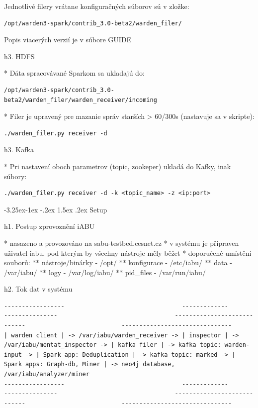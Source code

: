 \documentclass[a4paper]{article} %
\makeatletter
\renewcommand\subsection{\@startsection{subsection}{2}{\z@}%
                   {-3.25ex\@plus -1ex \@minus -.2ex}%
                   {1.5ex \@plus .2ex}%
                   {\normalfont\sffamily\large\bfseries\color{projectcolor}}}
\makeatother
\begin{document}
Jednotlivé filery vrátane konfiguračných súborov sú v zložke:
\begin{lstlisting}[]/opt/warden3-spark/contrib_3.0-beta2/warden_filer/\end{lstlisting}

Popis viacerých verzií je v súbore GUIDE

h3. HDFS

* Dáta spracovávané Sparkom sa ukladajú do:
\begin{lstlisting}[]/opt/warden3-spark/contrib_3.0-beta2/warden_filer/warden_receiver/incoming\end{lstlisting}

* Filer je upravený pre mazanie správ starších > 60/300s (nastavuje sa v skripte):
\begin{lstlisting}[]./warden_filer.py receiver -d\end{lstlisting}


h3. Kafka

* Pri nastavení oboch parametrov (topic, zookeper) ukladá do Kafky, inak súbory:
\begin{lstlisting}[]./warden_filer.py receiver -d -k <topic_name> -z <ip:port>\end{lstlisting}

\subsection{Setup}

h1. Postup zprovoznění iABU

* nasazeno a provozováno na sabu-testbed.cesnet.cz
* v systému je připraven uživatel iabu, pod kterým by všechny nástroje měly běžet
* doporučené umístění souborů:
** nástroje/binárky - /opt/
** konfigurace - /etc/iabu/
** data - /var/iabu/
** logy - /var/log/iabu/
** pid\_files - /var/run/iabu/

h2. Tok dat v systému

\begin{lstlisting}[]
-----------------                                 -------------                                  ---------------                                 ----------------------------                           -------------------------------
| warden client | -> /var/iabu/warden_receiver -> | inspector | -> /var/iabu/mentat_inspector -> | kafka filer | -> kafka topic: warden-input -> | Spark app: Deduplication | -> kafka topic: marked -> | Spark apps: Graph-db, Miner | -> neo4j database, /var/iabu/analyzer/miner
-----------------                                 -------------                                  ---------------                                 ----------------------------                           -------------------------------
\end{lstlisting}
\end{document}

